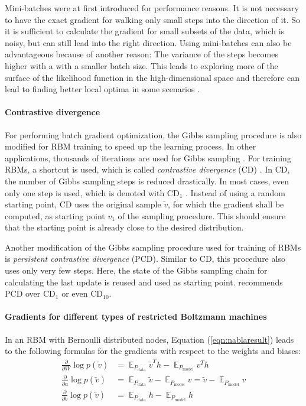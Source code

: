 \documentclass[12pt]{article}
\DeclareMathOperator{\EX}{\mathbb{E}}
\begin{document}
Mini-batches were at first introduced for performance reasons.
It is not necessary to have the exact gradient for walking only small steps into the direction of it.
So it is sufficient to calculate the gradient for small subsets of the data, which is noisy, but can still lead into the right direction.
Using mini-batches can also be advantageous because of another reason: The variance of the steps becomes higher with a with a smaller batch size. This leads to exploring more of the surface of the likelihood function in the high-dimensional space and therefore can lead to finding better local optima in some scenarios \citep{bengio2012practical}.

\paragraph{Contrastive divergence}

For performing batch gradient optimization, the Gibbs sampling procedure is also modified for RBM training to speed up the learning process.
In other applications, thousands of iterations are used for Gibbs sampling  \citep{gibbssamplingorig}. For training RBMs, a shortcut is used, which is called {\em contrastive divergence} (CD) \citep{cdorig, perpinan_contrastive_2005}.
In CD, the number of Gibbs sampling steps is reduced drastically. In most cases, even only one step is used, which is denoted with $\text{CD}_1$ \citep{hinton_practical_2012}.
Instead of using a random starting point, CD uses the original sample $\tilde{v}$, for which the gradient shall be computed, as starting point $v_1$ of the sampling procedure. This should ensure that the starting point is already close to the desired distribution.

Another modification of the Gibbs sampling procedure used for training of RBMs is {\em persistent contrastive divergence} (PCD).
Similar to CD, this procedure also uses only very few steps. Here, the state of the Gibbs sampling chain for calculating the last update is reused and used as starting point. \cite{hinton_practical_2012} recommends PCD over $\text{CD}_1$ or even $\text{CD}_{10}$.

\paragraph{Gradients for different types of restricted Boltzmann machines}\label{rbmgradients}

In an RBM with Bernoulli distributed nodes, Equation (\ref{eqn:nablaresult}) leads to the following formulas for the gradients with respect to the weights and biases:
\begin{align*}
\frac{\partial}{\partial W}  \log p(\tilde{v}) &= \EX_{P_\text{data}}  \tilde{v}^T h - \EX_{P_\text{model}} v^T h \\
\frac{\partial}{\partial a}  \log p(\tilde{v}) &=  \EX_{P_\text{data}}
\tilde{v} - \EX_{P_\text{model}}  v = \tilde{v} - \EX_{P_\text{model}} v\\
\frac{\partial}{\partial b}  \log p(\tilde{v}) &=  \EX_{P_\text{data}} h - \EX_{P_\text{model}} h
\end{align*}
\end{document}
